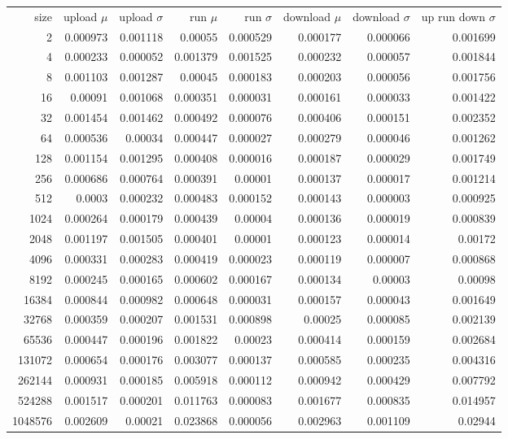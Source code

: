 \begin{tabular}{r r r r r r r r}
size & upload $\mu$  & upload $\sigma$ & run $\mu$ & run $\sigma$ & download $\mu$ & download $\sigma$ & up run down $\sigma$ \\
2 & 0.000973 & 0.001118 & 0.00055 & 0.000529 & 0.000177 & 0.000066 & 0.001699 \\
4 & 0.000233 & 0.000052 & 0.001379 & 0.001525 & 0.000232 & 0.000057 & 0.001844 \\
8 & 0.001103 & 0.001287 & 0.00045 & 0.000183 & 0.000203 & 0.000056 & 0.001756 \\
16 & 0.00091 & 0.001068 & 0.000351 & 0.000031 & 0.000161 & 0.000033 & 0.001422 \\
32 & 0.001454 & 0.001462 & 0.000492 & 0.000076 & 0.000406 & 0.000151 & 0.002352 \\
64 & 0.000536 & 0.00034 & 0.000447 & 0.000027 & 0.000279 & 0.000046 & 0.001262 \\
128 & 0.001154 & 0.001295 & 0.000408 & 0.000016 & 0.000187 & 0.000029 & 0.001749 \\
256 & 0.000686 & 0.000764 & 0.000391 & 0.00001 & 0.000137 & 0.000017 & 0.001214 \\
512 & 0.0003 & 0.000232 & 0.000483 & 0.000152 & 0.000143 & 0.000003 & 0.000925 \\
1024 & 0.000264 & 0.000179 & 0.000439 & 0.00004 & 0.000136 & 0.000019 & 0.000839 \\
2048 & 0.001197 & 0.001505 & 0.000401 & 0.00001 & 0.000123 & 0.000014 & 0.00172 \\
4096 & 0.000331 & 0.000283 & 0.000419 & 0.000023 & 0.000119 & 0.000007 & 0.000868 \\
8192 & 0.000245 & 0.000165 & 0.000602 & 0.000167 & 0.000134 & 0.00003 & 0.00098 \\
16384 & 0.000844 & 0.000982 & 0.000648 & 0.000031 & 0.000157 & 0.000043 & 0.001649 \\
32768 & 0.000359 & 0.000207 & 0.001531 & 0.000898 & 0.00025 & 0.000085 & 0.002139 \\
65536 & 0.000447 & 0.000196 & 0.001822 & 0.00023 & 0.000414 & 0.000159 & 0.002684 \\
131072 & 0.000654 & 0.000176 & 0.003077 & 0.000137 & 0.000585 & 0.000235 & 0.004316 \\
262144 & 0.000931 & 0.000185 & 0.005918 & 0.000112 & 0.000942 & 0.000429 & 0.007792 \\
524288 & 0.001517 & 0.000201 & 0.011763 & 0.000083 & 0.001677 & 0.000835 & 0.014957 \\
1048576 & 0.002609 & 0.00021 & 0.023868 & 0.000056 & 0.002963 & 0.001109 & 0.02944 \\

\end{tabular}
